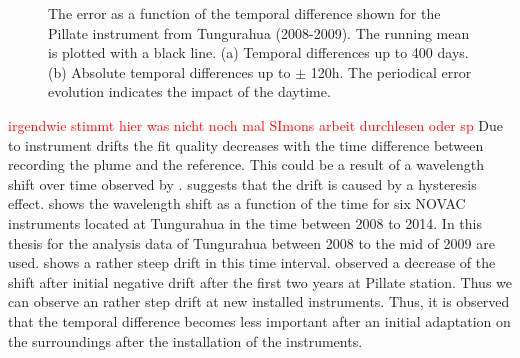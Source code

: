 \begin{figure}
	\caption{The  error as a function of the temporal difference shown for the Pillate instrument from Tungurahua (2008-2009). The running mean is plotted with a black line. (a) Temporal differences up to 400 days. (b) Absolute temporal differences up to $\pm$ 120h. The periodical   error evolution indicates the impact of the daytime. }
	\label{fig:dat}
\end{figure}
%
\textcolor{red}{irgendwie stimmt hier was nicht noch mal SImons arbeit durchlesen oder sp}
Due to instrument drifts the fit quality decreases with the time difference between recording the plume and the reference. This could be a result of a wavelength shift over time observed by \citet{WarnachSimon}.  \citet{WarnachSimon} suggests that the drift is caused by a hysteresis effect.  shows the wavelength shift as a function of the time for six NOVAC instruments located at Tungurahua in the time between 2008 to 2014. In this thesis for the analysis data of Tungurahua between 2008 to the mid of 2009 are used.  shows a rather steep drift in this time interval.
\citet{WarnachSimon} observed a decrease of the shift after initial negative drift after the first two years at Pillate station. Thus we can observe an rather step drift at new installed instruments. Thus, it is observed that the temporal difference becomes less important after an initial adaptation on the surroundings after the installation of the instruments.\\
